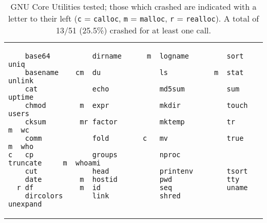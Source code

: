 \begin{table}[h]
\begin{tabular}{l}
\begin{lstlisting}
    base64          dirname      m  logname         sort            uniq
    basename    cm  du              ls           m  stat            unlink
    cat             echo            md5sum          sum             uptime
    chmod        m  expr            mkdir           touch           users
    cksum        mr factor          mktemp          tr           m  wc
    comm            fold        c   mv              true         m  who
c   cp              groups          nproc           truncate     m  whoami
    cut             head            printenv        tsort
    date         m  hostid          pwd             tty
  r df           m  id              seq             uname
    dircolors       link            shred           unexpand
\end{lstlisting}
\end{tabular}
\caption{GNU Core Utilities tested; those which crashed are indicated with a letter to their left (\texttt{c} = \texttt{calloc}, \texttt{m} = \texttt{malloc}, \texttt{r} = \texttt{realloc}). A total of 13/51 (25.5\%) crashed for at least one call.}
\label{lst:coreutils}
\end{table}
